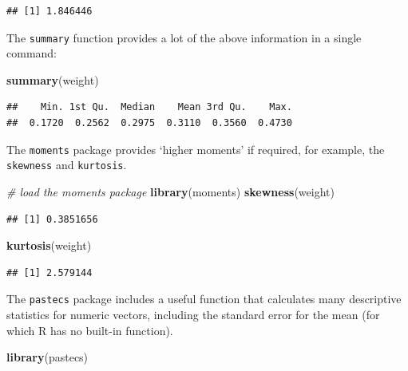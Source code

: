 \documentclass[]{book}
\newenvironment{Shaded}{\begin{snugshade}}{\end{snugshade}}
\newcommand{\CommentTok}[1]{\textcolor[rgb]{0.56,0.35,0.01}{\textit{#1}}}
\newcommand{\KeywordTok}[1]{\textcolor[rgb]{0.13,0.29,0.53}{\textbf{#1}}}
\newcommand{\NormalTok}[1]{#1}
\begin{document}
\begin{verbatim}
## [1] 1.846446
\end{verbatim}

The \texttt{summary} function provides a lot of the above information in a single command:

\begin{Shaded}
\begin{Highlighting}[]
\KeywordTok{summary}\NormalTok{(weight)}
\end{Highlighting}
\end{Shaded}

\begin{verbatim}
##    Min. 1st Qu.  Median    Mean 3rd Qu.    Max. 
##  0.1720  0.2562  0.2975  0.3110  0.3560  0.4730
\end{verbatim}

The \texttt{moments} package provides `higher moments' if required, for example,
the \texttt{skewness} and \texttt{kurtosis}.

\begin{Shaded}
\begin{Highlighting}[]
\CommentTok{# load the moments package}
\KeywordTok{library}\NormalTok{(moments)}
\KeywordTok{skewness}\NormalTok{(weight)}
\end{Highlighting}
\end{Shaded}

\begin{verbatim}
## [1] 0.3851656
\end{verbatim}

\begin{Shaded}
\begin{Highlighting}[]
\KeywordTok{kurtosis}\NormalTok{(weight)}
\end{Highlighting}
\end{Shaded}

\begin{verbatim}
## [1] 2.579144
\end{verbatim}

The \texttt{pastecs} package includes a useful function that calculates many descriptive statistics for numeric vectors, including the standard error for the mean (for which R has no built-in function).

\begin{Shaded}
\begin{Highlighting}[]
\KeywordTok{library}\NormalTok{(pastecs)}
\end{Highlighting}
\end{Shaded}
\end{document}
